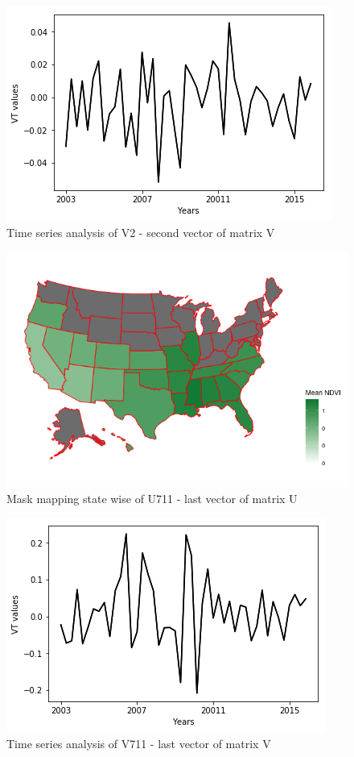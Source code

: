     \begin{figure}[H]
            \centering
            \includegraphics[width=0.85\linewidth]{figures/ch5/SVD/V2.png}
            \caption{\label{fig:V_2} Time series analysis of V2 - second vector of matrix V}
    \end{figure}
    
     \begin{figure}[H]
            \centering
            \includegraphics[width=0.85\linewidth]{figures/ch5/SVD/EOF_3.png}
            \caption{\label{fig:EOF_3} Mask mapping state wise of U711 - last vector of matrix U}
    \end{figure}
    
     \begin{figure}[H]
            \centering
            \includegraphics[width=0.85\linewidth]{figures/ch5/SVD/V3.png}
            \caption{\label{fig:V_3} Time series analysis of V711 - last vector of matrix V}
    \end{figure}